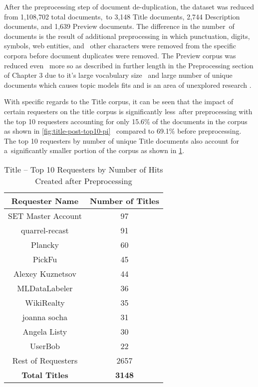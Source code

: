 \documentclass[letterpaper,12pt]{article}
\begin{document}
\newpage

After the preprocessing step of document de-duplication, the dataset was reduced from 1,108,702 total documents,\
to 3,148 Title documents, 2,744 Description documents, and 1,639 Preview documents. The difference in the number\
of documents is the result of additional preprocessing in which punctuation, digits, symbols, web entities, and \
other characters were removed from the specific corpora before document duplicates were removed. The Preview corpus was reduced even \ 
more so as described in further length in the Preprocessing section of Chapter 3 due to it's large vocabulary size \ 
and large number of unique documents which causes topic models fits and is an area of unexplored research \cite{dieng2019topic}.\

With specific regards to the Title corpus, it can be seen that the impact of certain requesters on the title corpus is significantly less\
after preprocessing with the top 10 requesters accounting for only 15.6\% of the documents in the corpus as shown in \ref{fig:title-post-top10-pi} \
compared to 69.1\% before preprocessing. The top 10 requesters by number of unique Title documents also account for a\
significantly smaller portion of the corpus as shown in \ref{tab:title_requester_top_10}.

\begin{table}
	\caption{\label{tab:title_requester_top_10} Title -- Top 10 Requesters by Number of Hits Created after Preprocessing}
	\begin{center}
		\begin{tabular}{| c | c |}
			\hline
			\textbf{Requester Name} &  \textbf{Number of Titles} \\
			\hline
			SET Master Account &              97 \\
			\hline
			quarrel-recast     &              91 \\
			\hline
			Plancky            &              60 \\
			\hline
			PickFu             &              45 \\
			\hline
			Alexey Kuznetsov   &              44 \\
			\hline
			MLDataLabeler      &              36 \\
			\hline
			WikiRealty         &              35 \\
			\hline
			joanna socha       &              31 \\
			\hline
			Angela Listy       &              30 \\
			\hline
			UserBob            &              22 \\
			\hline
			Rest of Requesters &            2657 \\
			\hline
			\textbf{Total Titles} & \textbf{3148} \\
			\hline
		\end{tabular}
	\end{center}
\end{table}
\end{document}
